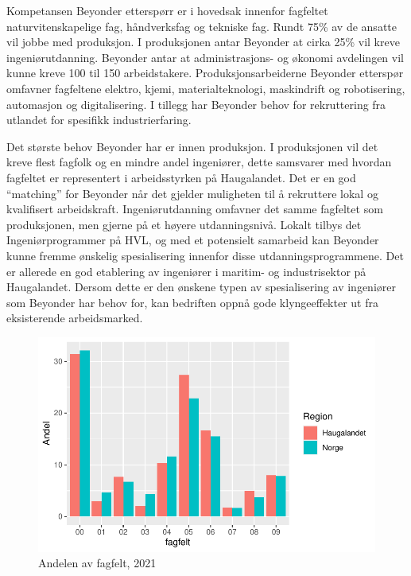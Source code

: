 \documentclass[
]{article}
\begin{document}
Kompetansen Beyonder etterspørr er i hovedsak innenfor fagfeltet
naturvitenskapelige fag, håndverksfag og tekniske fag. Rundt 75\% av de
ansatte vil jobbe med produksjon. I produksjonen antar Beyonder at cirka
25\% vil kreve ingeniørutdanning. Beyonder antar at administrasjons- og
økonomi avdelingen vil kunne kreve 100 til 150 arbeidstakere.
Produksjonsarbeiderne Beyonder etterspør omfavner fagfeltene elektro,
kjemi, materialteknologi, maskindrift og robotisering, automasjon og
digitalisering. I tillegg har Beyonder behov for rekruttering fra
utlandet for spesifikk industrierfaring.

Det største behov Beyonder har er innen produksjon. I produksjonen vil
det kreve flest fagfolk og en mindre andel ingeniører, dette samsvarer
med hvordan fagfeltet er representert i arbeidsstyrken på Haugalandet.
Det er en god ``matching'' for Beyonder når det gjelder muligheten til å
rekruttere lokal og kvalifisert arbeidskraft. Ingeniørutdanning omfavner
det samme fagfeltet som produksjonen, men gjerne på et høyere
utdanningsnivå. Lokalt tilbys det Ingeniørprogrammer på HVL, og med et
potensielt samarbeid kan Beyonder kunne fremme ønskelig spesialisering
innenfor disse utdanningsprogrammene. Det er allerede en god etablering
av ingeniører i maritim- og industrisektor på Haugalandet. Dersom dette
er den ønskene typen av spesialisering av ingeniører som Beyonder har
behov for, kan bedriften oppnå gode klyngeeffekter ut fra eksisterende
arbeidsmarked.

\begin{figure}[H]

{\centering \includegraphics{Masteroppgave_files/figure-pdf/fig-fagfelt-1.pdf}

}

\caption{\label{fig-fagfelt}Andelen av fagfelt, 2021}

\end{figure}
\end{document}

